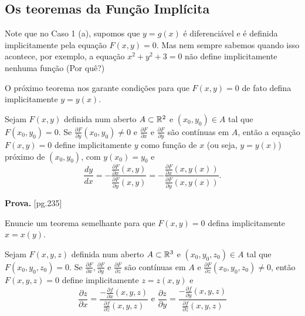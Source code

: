     \subsection{Os teoremas da Função Implícita}

\begin{remark}
    Note que no Caso 1 (a), supomos que \(y = g(x)\) é diferenciável e é definida implicitamente pela equação \(F(x,y) = 0\). Mas nem sempre sabemos quando isso acontece, por exemplo, a equação \(x^2 + y^2 + 3 = 0\) não define implicitamente nenhuma função (Por quê?)
\end{remark}

O próximo teorema nos garante condições para que \(F(x,y) = 0\) de fato defina implicitamente \(y = y(x)\).

\begin{theorem}[Teorema da Função Implícita - \(F(x,y) = 0\)]
    Sejam \(F(x,y)\) definida num aberto \(A\subset\mathbb{R}^2\) e \((x_0,y_0)\in A\) tal que \(F(x_0,y_0) = 0\). Se \(\frac{\partial F}{\partial y}(x_0,y_0) \neq 0\) e \(\frac{\partial F}{\partial x}\) e \(\frac{\partial F}{\partial y}\) são contínuas em \(A\), então a equação \(F(x,y) = 0\) define implicitamente \(y\) como função de \(x\) (ou seja, \(y = y(x)\)) próximo de \((x_0,y_0)\), com \(y(x_0) = y_0\) e \[\frac{dy}{dx} = - \frac{\frac{\partial F}{\partial x}(x,y)}{\frac{\partial F}{\partial y}(x,y)} = - \frac{\frac{\partial F}{\partial x}(x,y(x))}{\frac{\partial F}{\partial y}(x,y(x))}.\]
\end{theorem}
\textbf{Prova. } \cite{guidorizzi}[pg.235]

\begin{exercise}
    Enuncie um teorema semelhante para que \(F(x,y) = 0\) defina implicitamente \(x = x(y)\).
\end{exercise}

\begin{theorem}[Função Implícita - \(F(x,y,z) = 0\)]
    Sejam \(F(x,y,z)\) definida num aberto \(A\subset\mathbb{R}^3\) e \((x_0,y_0,z_0)\in A\) tal que \(F(x_0,y_0,z_0) = 0\). Se \(\frac{\partial F}{\partial x}, \frac{\partial F}{\partial y}\) e \(\frac{\partial F}{\partial z}\) são contínuas em \(A\) e \(\frac{\partial F}{\partial z}(x_0,y_0,z_0) \neq 0\), então \(F(x,y,z) = 0\) define implicitamente \(z = z(x,y)\) e \[\frac{\partial z}{\partial x} = \frac{- \frac{\partial f}{\partial x}(x,y,z)}{\frac{\partial f}{\partial z}(x,y,z)} \text{ e } \frac{\partial z}{\partial y} = \frac{-\frac{\partial f}{\partial y}(x,y,z)}{\frac{\partial f}{\partial z}(x,y,z)}\]
\end{theorem}

